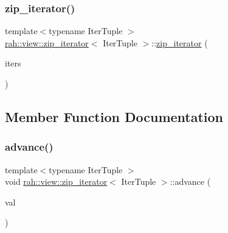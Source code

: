 \subsubsection{\texorpdfstring{zip\_iterator()}{zip\_iterator()}\hspace{0.1cm}{\footnotesize\ttfamily [2/2]}}
{\footnotesize\ttfamily template$<$typename Iter\+Tuple $>$ \\
\mbox{\hyperlink{structrah_1_1view_1_1zip__iterator}{rah\+::view\+::zip\+\_\+iterator}}$<$ Iter\+Tuple $>$\+::\mbox{\hyperlink{structrah_1_1view_1_1zip__iterator}{zip\+\_\+iterator}} (\begin{DoxyParamCaption}\item[{Iter\+Tuple const \&}]{iters }\end{DoxyParamCaption})\hspace{0.3cm}{\ttfamily [inline]}}



\subsection{Member Function Documentation}
\mbox{\label{structrah_1_1view_1_1zip__iterator_abc9b6f7ff787d1a08c4a327d738a1809}} 
\subsubsection{\texorpdfstring{advance()}{advance()}\hspace{0.1cm}{\footnotesize\ttfamily [1/2]}}
{\footnotesize\ttfamily template$<$typename Iter\+Tuple $>$ \\
void \mbox{\hyperlink{structrah_1_1view_1_1zip__iterator}{rah\+::view\+::zip\+\_\+iterator}}$<$ Iter\+Tuple $>$\+::advance (\begin{DoxyParamCaption}\item[{intptr\+\_\+t}]{val }\end{DoxyParamCaption})\hspace{0.3cm}{\ttfamily [inline]}}

\mbox{\label{structrah_1_1view_1_1zip__iterator_abc9b6f7ff787d1a08c4a327d738a1809}} 

